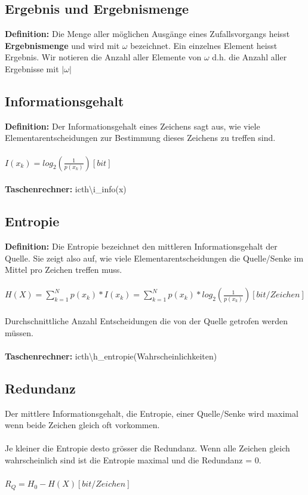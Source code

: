 \subsection{Ergebnis und Ergebnismenge}
\textbf{Definition:} Die Menge aller möglichen Ausgänge eines Zufallsvorgangs heisst \textbf{Ergebnismenge} und wird mit $\omega$ bezeichnet. Ein einzelnes Element heisst Ergebnis. Wir notieren die Anzahl aller Elemente von $\omega$ d.h. die Anzahl aller Ergebnisse mit $| \omega |$

\subsection{Informationsgehalt}
\textbf{Definition:} Der Informationsgehalt eines Zeichens sagt aus, wie viele Elementarentscheidungen zur Bestimmung dieses Zeichens zu treffen sind.\\
\\
$I(x_{k})=log_2(\frac{1}{p(x_k)})[bit]$
\\
\\
\textbf{Taschenrechner:} icth\textbackslash i\_info(x)
\subsection{Entropie}
\textbf{Definition:} Die Entropie bezeichnet den mittleren Informationsgehalt der Quelle. Sie zeigt also auf, wie viele Elementarentscheidungen die Quelle/Senke im Mittel pro Zeichen treffen muss. \\
\\
$H(X)=\sum_{k=1}^{N}p(x_k)*I(x_k)=\sum_{k=1}^{N}p(x_k)*log_2(\frac{1}{p(x_k)})[bit/Zeichen]$
\\ \\
Durchschnittliche Anzahl Entscheidungen die von der Quelle getrofen werden müssen. \\ \\
\textbf{Taschenrechner:} icth\textbackslash h\_entropie({Wahrscheinlichkeiten})

\subsection{Redundanz}
Der mittlere Informationsgehalt, die Entropie, einer Quelle/Senke wird maximal wenn beide Zeichen gleich oft vorkommen. \\ \\
Je kleiner die Entropie desto grösser die Redundanz. Wenn alle Zeichen gleich wahrscheinlich sind ist die Entropie maximal und die Redundanz = 0. \\ \\
$R_Q=H_0-H(X)[bit/Zeichen]$

